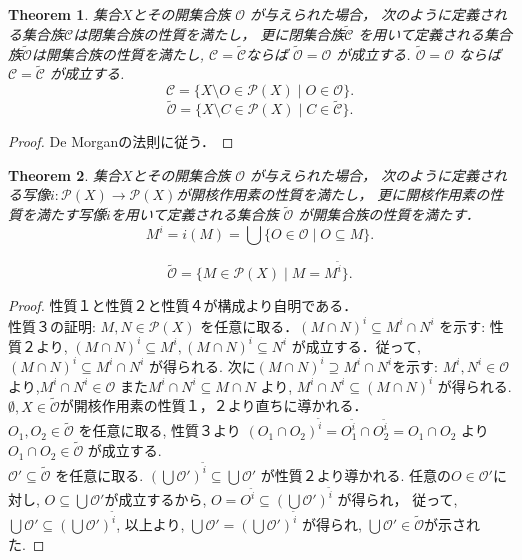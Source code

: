 \documentclass[dvipdfmx]{jbook}
\newtheorem{theorem}{Theorem}[section]
\theoremstyle{remark}
\theoremstyle{plain}
\begin{document}
\begin{theorem}
集合$X$とその開集合族 $\mathcal{O}$ が与えられた場合，
次のように定義される集合族$\mathcal{C}$は閉集合族の性質を満たし，
更に閉集合族$\tilde{\mathcal{C}}$ を用いて定義される集合族$\tilde{\mathcal{O}}$は開集合族の性質を満たし,
$\mathcal{C} = \tilde{\mathcal{C}}$ならば $\tilde{\mathcal{O}} = \mathcal{O}$  が成立する. $\tilde{\mathcal{O}} = \mathcal{O}$ ならば $\mathcal{C} = \tilde{\mathcal{C}}$ が成立する.
	 \[
	\mathcal{C} = \{X \setminus O \in \mathcal{P}(X) \mid O \in \mathcal{O} \} 
	.\] 
	\[
		\tilde{\mathcal{O}} = \{ X \setminus C \in \mathcal{P}(X)  \mid C \in \tilde{\mathcal{C}} \} 
	.\] 
\end{theorem}

\begin{proof}
	De Morganの法則に従う．	
\end{proof}

\begin{theorem}
	集合$X$とその開集合族 $\mathcal{O}$ が与えられた場合，
	次のように定義される写像$i: \mathcal{P}(X) \to  \mathcal{P}(X)$が開核作用素の性質を満たし，
	更に開核作用素の性質を満たす写像$\tilde{i}$を用いて定義される集合族 $\tilde{\mathcal{O}}$ が開集合族の性質を満たす．
	\[
	M^{i}= i(M) = \bigcup \{O \in \mathcal{O} \mid O \subseteq M\} 
	.\] 

	\[
		\tilde{\mathcal{O}} =\{ M \in \mathcal{P}(X) \mid M = M^{\tilde{i}}\} 
	.\] 
\end{theorem}

\begin{proof}
	性質１と性質２と性質４が構成より自明である．\\
	性質３の証明: $M , N \in \mathcal{P}(X)$ を任意に取る．$\left( M \cap N \right) ^{i} \subseteq M^{i} \cap N^{i}$ を示す: 性質２より, $\left( M \cap N \right)^{i} \subseteq M^{i}, \left( M \cap N \right) ^{i} \subseteq N^{i} $ が成立する．従って, $\left( M \cap  N \right) ^{i } \subseteq M^{i} \cap  N^{i}$ 
	が得られる. 次に$(M\cap N)^{i} \supseteq M^{i}  \cap  N ^{i}$を示す: $M^{i} , N^{i} \in \mathcal{O}$より,$ M^{i} \cap  N^{ i} \in \mathcal{O}$ また$M^{i} \cap N^{i} \subseteq M \cap N$ より, $M^{i} \cap N^{i} \subseteq \left( M \cap N \right) ^{i}$ が得られる.\\
	$\emptyset , X \in \tilde{\mathcal{O}}$が開核作用素の性質１，２より直ちに導かれる．\\
	$O_1, O_2 \in \tilde{\mathcal{O}}$ を任意に取る, 性質３より
	$(O_1 \cap O_2)^{\tilde{i}} = O_1 ^{\tilde{i}} \cap O_2^{\tilde{i}} = O_1 \cap O_2$ より $O_1 \cap O_2 \in \tilde{\mathcal{O}}$ が成立する.\\
	$\mathcal{O}' \subseteq \tilde{\mathcal{O}}$ を任意に取る. 
	$\left(\bigcup \mathcal{O}' \right) ^{\tilde{i}} \subseteq \bigcup \mathcal{O}'  $ が性質２より導かれる. 
	任意の$O \in \mathcal{O}'$に対し, $O \subseteq \bigcup \mathcal{O}' $が成立するから, 
	$O = O^{\tilde{i}} \subseteq  \left(\bigcup \mathcal{O}'\right) ^{\tilde{i}}$ が得られ，
	従って, $\bigcup \mathcal{O}' \subseteq \left(\bigcup \mathcal{O}' \right)^{\tilde{i}}  $,
	以上より, $\bigcup \mathcal{O}' = \left( \bigcup \mathcal{O}'  \right) ^{\tilde{i}}$ が得られ, 
	$\bigcup \mathcal{O}' \in \tilde{\mathcal{O}}$が示された.
\end{proof}
\end{document}
